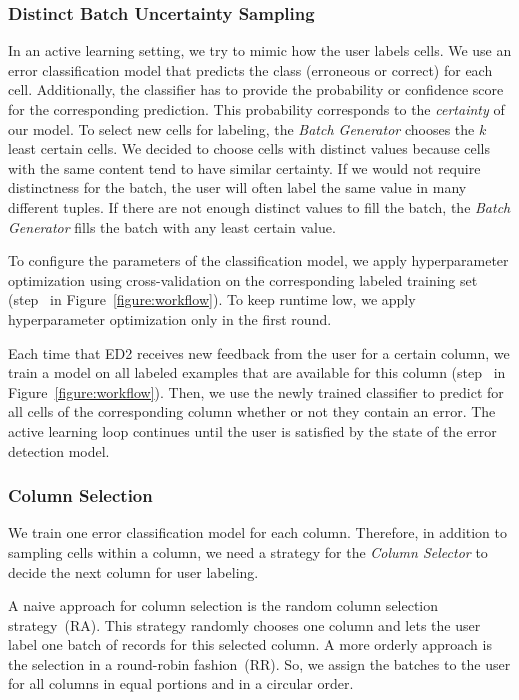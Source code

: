 \subsubsection{Distinct Batch Uncertainty Sampling}
\label{sec:uncertaintysampling}
In an active learning setting, we try to mimic how the user labels cells. 
We use an error classification model that predicts the class (erroneous or correct) for each cell. Additionally, the classifier has to provide the probability or confidence score for the corresponding prediction. This probability corresponds to the \emph{certainty} of our model. 
To select new cells for labeling, the \emph{Batch Generator} chooses the $k$ least certain cells. 
We decided to choose cells with distinct values because cells with the same content tend to have similar certainty. If we would not require distinctness for the batch, the user will often label the same value in many different tuples. If there are not enough distinct values to fill the batch, the \emph{Batch Generator} fills the batch with any least certain value.

To configure the parameters of the classification model, we apply hyperparameter optimization using cross-validation on the corresponding labeled training set (step~ in Figure~\ref{figure:workflow}). To keep runtime low, we apply hyperparameter optimization only in the first round.

Each time that ED2 receives new feedback from the user for a certain column, we train a model on all labeled examples that are available for this column (step~ in Figure~\ref{figure:workflow}). Then, we use the newly trained classifier to predict for all cells of the corresponding column whether or not they contain an error. The active learning loop continues until the user is satisfied by the state of the error detection model.


\subsubsection{Column Selection}
\label{sec:order}

We train one error classification model for each column. Therefore, in addition to sampling cells within a column, we need a strategy for the \emph{Column Selector} to decide the next column for user labeling.

A naive approach for column selection is the random column selection strategy~(RA). This strategy randomly chooses one column and lets the user label one batch of records for this selected column. A more orderly approach is the selection in a round-robin fashion~(RR). So, we assign the batches to the user for all columns in equal portions and in a circular order.


